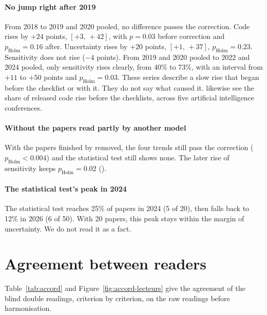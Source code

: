 \paragraph{No jump right after 2019}
From 2018 to 2019 and 2020 pooled, no difference passes the correction. Code rises by $+24$ points,
$[+3,\,+42]$, with $p = 0.03$ before correction and $p_{\text{Holm}} = 0.16$ after. Uncertainty rises
by $+20$ points, $[+1,\,+37]$, $p_{\text{Holm}} = 0.23$. Sensitivity does not rise ($-4$ points). From
2019 and 2020 pooled to 2022 and 2024 pooled, only sensitivity rises clearly, from 40\% to 73\%, with an
interval from $+11$ to $+50$ points and $p_{\text{Holm}} = 0.03$. These series describe a slow rise that
began before the checklist or with it. They do not say what caused it. \textcite{coakley2026shift}
likewise see the share of released code rise before the checklists, across five artificial
intelligence conferences.

\paragraph{Without the papers read partly by another model}
With the papers finished by  removed, the four trends still pass the correction
($p_{\text{Holm}} < 0.004$) and the statistical test still shows none. The later rise of sensitivity
keeps $p_{\text{Holm}} = 0.02$ ().

\paragraph{The statistical test's peak in 2024}
The statistical test reaches 25\% of papers in 2024 (5 of 20), then falls back to 12\% in 2026 (6 of
50). With 20 papers, this peak stays within the margin of uncertainty. We do not read it as a fact.

\section{Agreement between readers}\label{sec:sr-accord}

Table~\ref{tab:accord} and Figure~\ref{fig:accord-lecteurs} give the agreement of the blind double
readings, criterion by criterion, on the raw readings before harmonisation.



